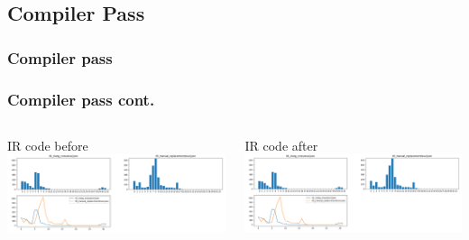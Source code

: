 \documentclass[11pt,t,usepdftitle=false,aspectratio=169]{beamer}
\begin{document}
\subsection{Compiler Pass}
\begin{frame}
  \frametitle{Compiler pass}

\end{frame}
\begin{frame}
  \frametitle{Compiler pass cont.}

  \begin{columns}[T]
    \begin{column}{0.48\textwidth}
      IR code before
      \includegraphics[width=\textwidth, height=\textheight, draft]{placeholder}
    \end{column}
    \hfill
    \begin{column}{0.48\textwidth}
      IR code after
      \includegraphics[width=\textwidth, height=\textheight, draft]{placeholder}
    \end{column}
  \end{columns}
\end{frame}
\end{document}
